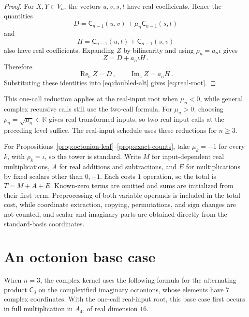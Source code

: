 \documentclass[11pt,reqno]{amsart}
\numberwithin{equation}{section}
\newcommand{\R}{\mathbb R}
\newcommand{\ReC}{\operatorname{Re}_{\mathrm c}}
\newcommand{\ImC}{\operatorname{Im}_{\mathrm c}}
\newcommand{\AltC}{\mathsf C}
\begin{document}
\begin{proof}
For $X,Y\in V_n$, the vectors $u,v,s,t$ have real coefficients. Hence the
quantities
\[
D=\AltC_{n-1}(u,v)+\mu_n\AltC_{n-1}(s,t)
\]
and
\[
H=\AltC_{n-1}(u,t)+\AltC_{n-1}(s,v)
\]
also have real coefficients. Expanding $Z$ by bilinearity and using
$\rho_n=a_n\iota$ gives
\[
Z=D+a_n\iota H\,.
\]
Therefore
\[
\ReC Z=D\,,\qquad\ImC Z=a_nH\,.
\]
Substituting these identities into \eqref{eq:doubled-alt} gives
\eqref{eq:real-root}.
\end{proof}

This one-call reduction applies at the real-input root when $\mu_n<0$,
while general complex recursive calls still use the two-call formula.
For $\mu_n>0$, choosing $\rho_n=\sqrt{\mu_n}\in\R$ gives real transformed
inputs, so two real-input calls at the preceding level suffice. The real-input
schedule uses these reductions for $n\ge3$.

For Propositions~\ref{prop:octonion-leaf}--\ref{prop:exact-counts}, take
$\mu_k=-1$ for every $k$, with $\rho_k=\iota$,
so the tower is standard.
Write $M$ for input-dependent real multiplications, $A$ for real additions
and subtractions, and $E$ for multiplications by fixed scalars other than
$0,\pm1$. Each costs $1$ operation, so the total is $T=M+A+E$.
Known-zero terms are omitted and sums are initialized from their first term.
Preprocessing of both variable operands is included in the total cost, while
coordinate extraction, copying, permutations, and sign changes are
not counted, and scalar and imaginary parts are obtained directly from
the standard-basis coordinates.

\section{An octonion base case}
\label{subsec:octonion-leaf}

When $n=3$, the complex kernel uses the following formula for the
alternating product $\AltC_3$ on the complexified imaginary octonions,
whose elements have $7$ complex coordinates. With the one-call real-input
root, this base case first occurs in full multiplication in $A_4$, of real
dimension $16$.
\end{document}
